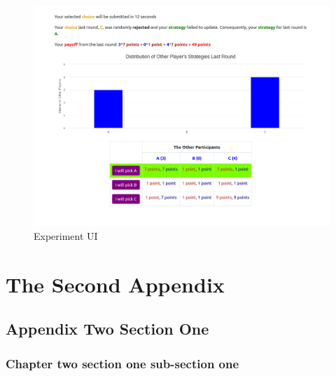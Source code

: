 \begin{figure}[h]
\captionsetup{justification=centering}
  \caption[caption]{Experiment UI}
   \label{fig:UI2}
    \includegraphics[width = \textwidth]{Images/Game1Reject.png}
\end{figure}


\setcounter{figure}{0}
\setcounter{table}{0}
\chapter{The Second Appendix}
\section{Appendix Two Section One}
\subsection{Chapter two section one sub-section one}

